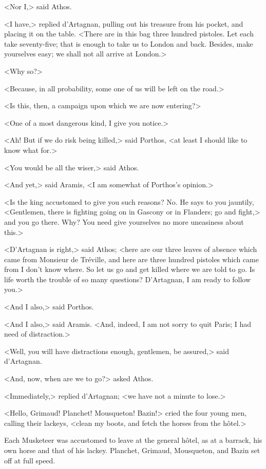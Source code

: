 <Nor I,> said Athos. 

<I have,> replied d'Artagnan, pulling out his treasure from his pocket, and placing it on the table. <There are in this bag three hundred pistoles. Let each take seventy-five; that is enough to take us to London and back. Besides, make yourselves easy; we shall not all arrive at London.> 

<Why so?> 

<Because, in all probability, some one of us will be left on the road.> 

<Is this, then, a campaign upon which we are now entering?> 

<One of a most dangerous kind, I give you notice.> 

<Ah! But if we do risk being killed,> said Porthos, <at least I should like to know what for.> 

<You would be all the wiser,> said Athos. 

<And yet,> said Aramis, <I am somewhat of Porthos's opinion.> 

<Is the king accustomed to give you such reasons? No. He says to you jauntily, <Gentlemen, there is fighting going on in Gascony or in Flanders; go and fight,> and you go there. Why? You need give yourselves no more uneasiness about this.> 

<D'Artagnan is right,> said Athos; <here are our three leaves of absence which came from Monsieur de Tréville, and here are three hundred pistoles which came from I don't know where. So let us go and get killed where we are told to go. Is life worth the trouble of so many questions? D'Artagnan, I am ready to follow you.> 

<And I also,> said Porthos. 

<And I also,> said Aramis. <And, indeed, I am not sorry to quit Paris; I had need of distraction.> 

<Well, you will have distractions enough, gentlemen, be assured,> said d'Artagnan. 

<And, now, when are we to go?> asked Athos. 

<Immediately,> replied d'Artagnan; <we have not a minute to lose.> 

<Hello, Grimaud! Planchet! Mousqueton! Bazin!> cried the four young men, calling their lackeys, <clean my boots, and fetch the horses from the hôtel.> 

Each Musketeer was accustomed to leave at the general hôtel, as at a barrack, his own horse and that of his lackey. Planchet, Grimaud, Mousqueton, and Bazin set off at full speed. 

